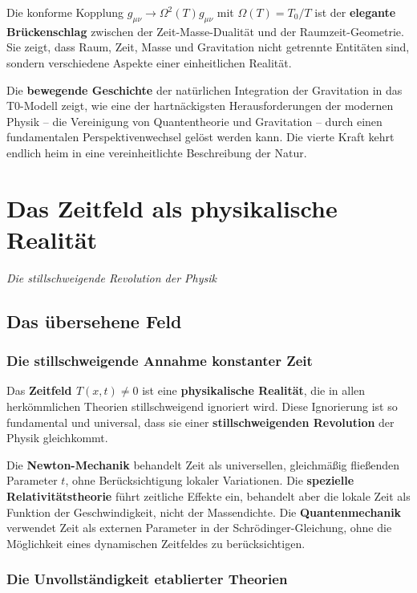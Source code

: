 \documentclass[12pt,a4paper]{report}
\begin{document}
Die konforme Kopplung $g_{\mu\nu} \to \Omega^2(T) g_{\mu\nu}$ mit $\Omega(T) = T_0/T$ ist der \textbf{elegante Brückenschlag} zwischen der Zeit-Masse-Dualität und der Raumzeit-Geometrie. Sie zeigt, dass Raum, Zeit, Masse und Gravitation nicht getrennte Entitäten sind, sondern verschiedene Aspekte einer einheitlichen Realität.

Die \textbf{bewegende Geschichte} der natürlichen Integration der Gravitation in das T0-Modell zeigt, wie eine der hartnäckigsten Herausforderungen der modernen Physik -- die Vereinigung von Quantentheorie und Gravitation -- durch einen fundamentalen Perspektivenwechsel gelöst werden kann. Die vierte Kraft kehrt endlich heim in eine vereinheitlichte Beschreibung der Natur.
% 

	\chapter{Das Zeitfeld als physikalische Realität}
\textit{Die stillschweigende Revolution der Physik}

\section{Das übersehene Feld}

\subsection{Die stillschweigende Annahme konstanter Zeit}

Das \textbf{Zeitfeld $T(x,t) \neq 0$} ist eine \textbf{physikalische Realität}, die in allen herkömmlichen Theorien stillschweigend ignoriert wird. Diese Ignorierung ist so fundamental und universal, dass sie einer \textbf{stillschweigenden Revolution} der Physik gleichkommt.

Die \textbf{Newton-Mechanik} behandelt Zeit als universellen, gleichmäßig fließenden Parameter $t$, ohne Berücksichtigung lokaler Variationen. Die \textbf{spezielle Relativitätstheorie} führt zeitliche Effekte ein, behandelt aber die lokale Zeit als Funktion der Geschwindigkeit, nicht der Massendichte. Die \textbf{Quantenmechanik} verwendet Zeit als externen Parameter in der Schrödinger-Gleichung, ohne die Möglichkeit eines dynamischen Zeitfeldes zu berücksichtigen.

\subsection{Die Unvollständigkeit etablierter Theorien}
\end{document}
